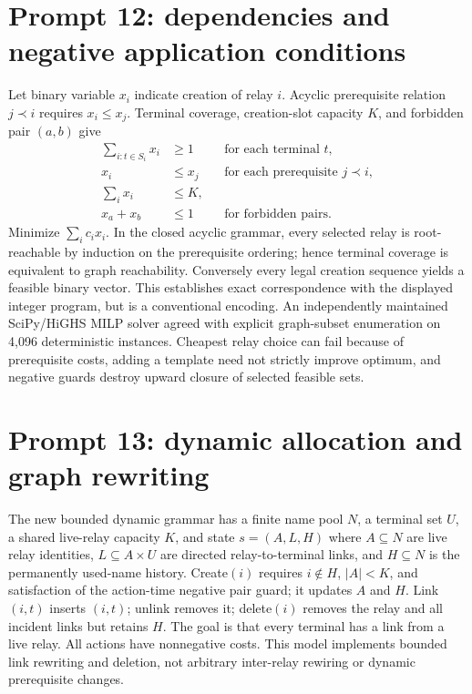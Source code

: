 \documentclass[10pt,a4paper]{article}
\begin{document}
\section{Prompt 12: dependencies and negative application conditions}
Let binary variable $x_i$ indicate creation of relay $i$. Acyclic prerequisite relation $j\prec i$ requires $x_i\le x_j$. Terminal coverage, creation-slot capacity $K$, and forbidden pair $(a,b)$ give
\begin{align*}
\sum_{i:t\in S_i}x_i&\ge1 &&\text{for each terminal }t,\\
x_i&\le x_j &&\text{for each prerequisite }j\prec i,\\
\sum_i x_i&\le K,\\
x_a+x_b&\le1 &&\text{for forbidden pairs}.
\end{align*}
Minimize $\sum_i c_i x_i$. In the closed acyclic grammar, every selected relay is root-reachable by induction on the prerequisite ordering; hence terminal coverage is equivalent to graph reachability. Conversely every legal creation sequence yields a feasible binary vector. This establishes exact correspondence with the displayed integer program, but is a conventional encoding. An independently maintained SciPy/HiGHS MILP solver agreed with explicit graph-subset enumeration on 4,096 deterministic instances. Cheapest relay choice can fail because of prerequisite costs, adding a template need not strictly improve optimum, and negative guards destroy upward closure of selected feasible sets.
\section{Prompt 13: dynamic allocation and graph rewriting}
The new bounded dynamic grammar has a finite name pool $N$, a terminal set $U$, a shared live-relay capacity $K$, and state $s=(A,L,H)$ where $A\subseteq N$ are live relay identities, $L\subseteq A\times U$ are directed relay-to-terminal links, and $H\subseteq N$ is the permanently used-name history. Create$(i)$ requires $i\notin H$, $|A|<K$, and satisfaction of the action-time negative pair guard; it updates $A$ and $H$. Link$(i,t)$ inserts $(i,t)$; unlink removes it; delete$(i)$ removes the relay and all incident links but retains $H$. The goal is that every terminal has a link from a live relay. All actions have nonnegative costs. This model implements bounded link rewriting and deletion, not arbitrary inter-relay rewiring or dynamic prerequisite changes.
\end{document}
